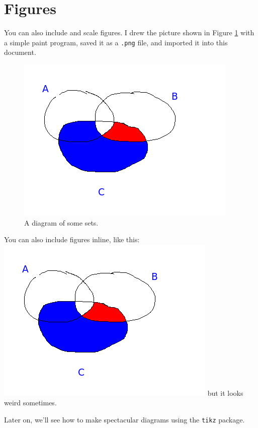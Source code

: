 \documentclass{article}
\begin{document}
\section{Figures}

You can also include and scale figures.
I drew the picture shown in Figure \ref{setfigure}
with a simple paint program, saved it as a {\tt .png}
file, and imported it into this document.


\begin{figure}
  \begin{center}
    \includegraphics[scale=0.5]{sets.png}
    \caption{A diagram of some sets.}
    \label{setfigure}
  \end{center}
\end{figure}

You can also include figures inline, like this:
\includegraphics[scale=0.5]{sets.png} but it looks weird sometimes.

Later on, we'll see how to make spectacular diagrams using the {\tt tikz}
package. 
\end{document}
